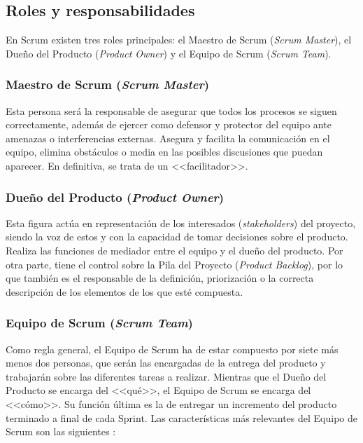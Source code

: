 \clearpage

\subsection{Roles y responsabilidades}
En Scrum existen tres roles principales: el Maestro de Scrum (\textit{Scrum Master}), el Dueño del Producto (\textit{Product Owner}) y el Equipo de Scrum (\textit{Scrum Team}).

\subsubsection{Maestro de Scrum (\textit{Scrum Master})}
Esta persona será la responsable de asegurar que todos los procesos se siguen correctamente, además de ejercer como defensor y protector del equipo ante amenazas o interferencias externas. Asegura y facilita la comunicación en el equipo, elimina obstáculos o media en las posibles discusiones que puedan aparecer. En definitiva, se trata de un <<facilitador>>.

\subsubsection{Dueño del Producto (\textit{Product Owner})}
Esta figura actúa en representación de los interesados (\textit{stakeholders}) del proyecto, siendo la voz de estos y con la capacidad de tomar decisiones sobre el producto. Realiza las funciones de mediador entre el equipo y el dueño del producto. Por otra parte, tiene el control sobre la Pila del Proyecto (\textit{Product Backlog}), por lo que también es el responsable de la definición, priorización o la correcta descripción de los elementos de los que esté compuesta.

\subsubsection{Equipo de Scrum (\textit{Scrum Team})}
Como regla general, el Equipo de Scrum ha de estar compuesto por siete más menos dos personas, que serán las encargadas de la entrega del producto y trabajarán sobre las diferentes tareas a realizar. Mientras que el Dueño del Producto se encarga del <<qué>>, el Equipo de Scrum se encarga del <<cómo>>. Su función última es la de entregar un incremento del producto terminado a final de cada Sprint. Las características más relevantes del Equipo de Scrum son las siguientes \cite{scrumguide}:

